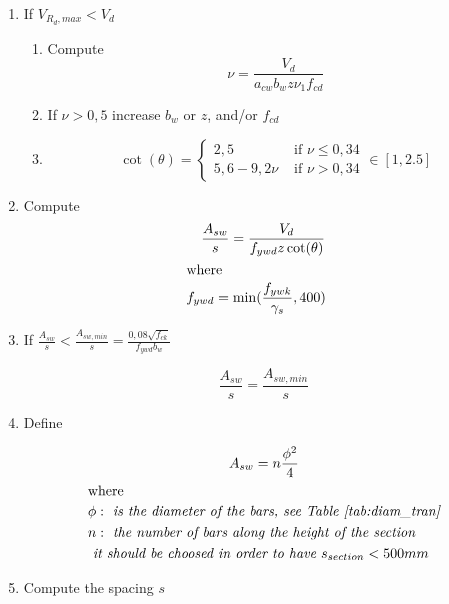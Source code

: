 \documentclass[landscape]{article}
\begin{document}
\begin{multicols*}{2}
\begin{enumerate}
  \item If $V_{R_d,max}< V_d$
    \begin{enumerate}
      \item Compute 
      \[
        \nu = \frac{V_d}{a_{cw} b_w z \nu_1 f_{cd}}
      \]
      \item If $\nu > 0,5$ increase $b_w$ or $z$, and/or $f_{cd}$
      \item 
      \begin{equation}
        \cot(\theta) = 
          \begin{cases}
            2,5 &\text{ if } \nu \leq 0,34\\
            5,6 - 9,2 \nu & \text{ if } \nu > 0,34
          \end{cases}\in [1,2.5]
      \end{equation}
    \end{enumerate}
  \item Compute
    \begin{gather}\label{eq:1.3}
        \frac{A_{sw}}{s}= \frac{V_d}{f_{ywd}z \cot(\theta)}\\
        \shortintertext{where}
        \begin{aligned}
          & f_{ywd} = \min(\frac{f_{ywk}}{\gamma_s},400)
        \end{aligned}\notag
      \end{gather}

  \item If $\frac{A_{sw}}{s} < \frac{A_{sw,min}}{s} = \frac{0,08 \sqrt{f_{ck}}}{f_{ywd}b_w}$

  \[
    \frac{A_{sw}}{s}=\frac{A_{sw,min}}{s}
  \]

  \item Define 

    \begin{gather}\label{eq:1.4}
        A_{sw}= n \frac{\phi^2}{4}\\
        \shortintertext{where}
        \begin{aligned}
          & \phi: \emph{ is the diameter of the bars, see Table~\ref{tab:diam_tran}}\\
          & n: \emph{ the number of bars along the height of the section}\\
          & \emph{ it should be choosed in order to have $s_{section}<500mm$}
        \end{aligned}\notag
    \end{gather}

  \item Compute the spacing $s$
\end{enumerate}


\end{multicols*}
\end{document}
